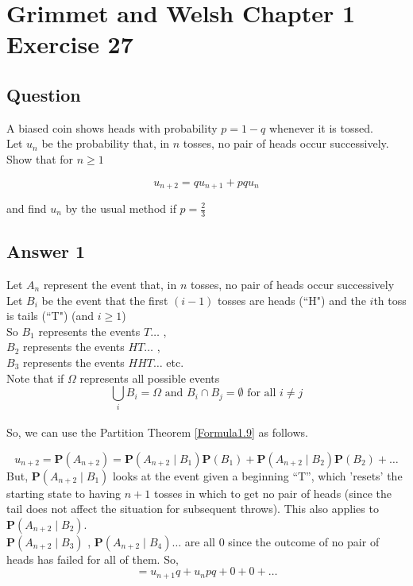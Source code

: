 \section{Grimmet and Welsh Chapter 1 Exercise 27}
\subsection{Question}

A biased coin shows heads with probability $p = 1 - q$ whenever it is tossed. \\
Let $u_n$ be the probability that, in $n$ tosses, no pair of heads occur successively. Show that for $n \geq 1$
 
\begin{equation*} 
u_{n+2} = q u_{n+1} + pq u_n 
\end{equation*}

and find $u_n$ by the usual method if $p = \frac{2}{3}$

\subsection{Answer 1}

Let $A_n$ represent the event that, in $n$ tosses, no pair of heads occur successively
Let $B_i$ be the event that the first $(i-1)$ tosses are heads (``H") and the $i$th toss is tails (``T") (and $i \geq 1$) \\
So $B_1$ represents the events $T\ldots$ ,\\
$B_2$ represents the events $HT\ldots$ ,\\
$B_3$ represents the events $HHT\ldots$  etc.\\

Note that if $\Omega$ represents all possible events
\begin{equation*} 
\bigcup_i B_i = \Omega    \text{ and }   B_i \cap B_j = \emptyset     \text{ for all } i \neq j
\end{equation*} \\

So, we can use the Partition Theorem \eqref{Formula1.9} as follows.

\begin{equation*} 
u_{n+2} = \mathbf{P}(A_{n+2}) = \mathbf{P}(A_{n+2} \mid B_1)\mathbf{P}(B_1) + \mathbf{P}(A_{n+2} \mid B_2)\mathbf{P}(B_2) + \ldots 
\end{equation*}
But, $\mathbf{P}(A_{n+2} \mid B_1)$ looks at the event given a beginning ``T'', which 'resets' the starting state to having $n+1$ tosses 
in which to get no pair of heads (since the tail does not affect the situation for subsequent throws). This also applies to $\mathbf{P}(A_{n+2} \mid B_2)$. \\
$\mathbf{P}(A_{n+2} \mid B_3)$ , $\mathbf{P}(A_{n+2} \mid B_4)\ldots$ are all $0$ since the outcome of no pair of heads has failed for all of them. So,  
\begin{equation*} 
= u_{n+1} q + u_n pq + 0 + 0 + \ldots 
\end{equation*}


